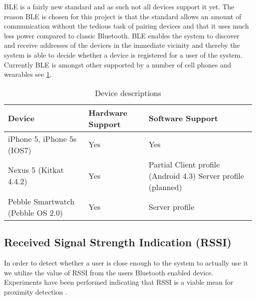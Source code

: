 BLE is a fairly new standard and as such not all devices support it yet.
The reason BLE is chosen for this project is that the standard allows an amount of communication without the tedious task of pairing devices and that it uses much less power compared to classic Bluetooth.
BLE enables the system to discover and receive addresses of the devices in the immediate vicinity and thereby the system is able to decide whether a device is registered for a user of the system.
Currently BLE is amongst other supported by a number of cell phones and wearables see \cref{table:devices}.

\begin{table}[!t]
\caption{Device descriptions}
\label{table:devices}
\centering
\begin{tabular}{|p{2.3cm}|p{1.3cm}|p{3.8cm}|}
\hline
\textbf{Device} & \textbf{Hardware Support} & \textbf{Software Support}\\
\hline
iPhone 5, iPhone 5s (IOS7) & Yes & Yes\\
\hline
Nexus 5 \newline (Kitkat 4.4.2) & Yes & Partial \newline
Client profile (Android 4.3)
Server profile (planned)\\
\hline
Pebble Smartwatch (Pebble OS 2.0) & Yes & Server profile\\
\hline
\end{tabular}
\end{table}

\subsection{Received Signal Strength Indication (RSSI)}

In order to detect whether a user is close enough to the system to actually use it we utilize the value of RSSI from the users Bluetooth enabled device.
Experiments have been performed indicating that RSSI is a viable mean for proximity detection \cite{ref:Takashi}.
